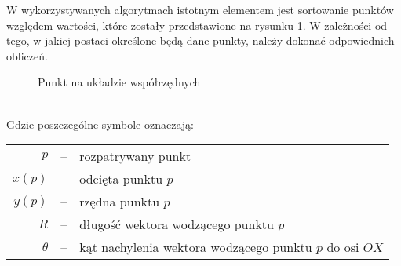         W wykorzystywanych algorytmach istotnym elementem jest sortowanie punktów względem wartości, które zostały przedstawione na rysunku \ref{fig:axis}. W zależności od tego, w jakiej postaci określone będą dane punkty, należy dokonać odpowiednich obliczeń.
        \begin{figure}[h!]
        	\begin{center}
    			
    			\caption{Punkt na układzie współrzędnych}						\label{fig:axis}	
    		\end{center}
    	\mysource
    	\end{figure}\vspace{-8 mm}\\
    	Gdzie poszczególne symbole oznaczają:\\
    	\begin{tabular}{rcl}
    	$p$ & -- & rozpatrywany punkt\\
    	$x\left( p \right)$ & -- & odcięta punktu $p$\\
    	$y\left( p \right)$ & -- & rzędna punktu $p$\\
    	$R$ & -- & długość wektora wodzącego punktu $p$\\
    	$\theta$ & -- & kąt nachylenia wektora wodzącego punktu $p$ do osi $OX$
    	\end{tabular}\\
    	
